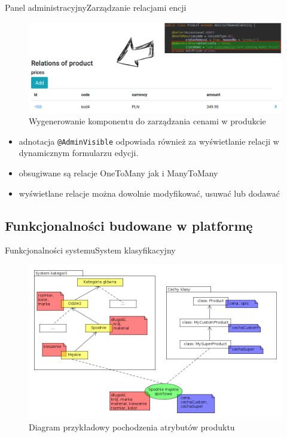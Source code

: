 \documentclass[polish,xcolor=table,9pt,aspectratio=1610,hyperref={pdfpagemode=FullScreen}]{beamer}
\begin{document}
\begin{frame}{Panel administracyjny}{Zarządzanie relacjami encji}

	\begin{figure}
		\begin{center}
			\includegraphics[scale=0.25]{relacjeWDFE.png}
		\end{center}
		\caption{{\color{black}Wygenerowanie komponentu do zarządzania cenami w produkcie}} 
	\end{figure}
\begin{itemize}
	\item<1-> adnotacja \texttt{@AdminVisible} odpowiada również za wyświetlanie relacji w dynamicznym formularzu edycji. 
	\item<1-> obsugiwane są relacje OneToMany jak i ManyToMany
	\item<1-> wyświetlane relacje można dowolnie modyfikować, usuwać lub dodawać
\end{itemize}
\end{frame}


\subsection{Funkcjonalności budowane w platformę}

\begin{frame}{Funkcjonalności systemu}{System klasyfikacyjny}
	\begin{figure}
		\begin{center}
			\includegraphics[scale=0.3]{cechyProd.png}
		\end{center}
		\caption{{\color{black}Diagram przykładowy pochodzenia atrybutów produktu}} \label{cechyProd}
	\end{figure}
\end{frame}
\end{document}

